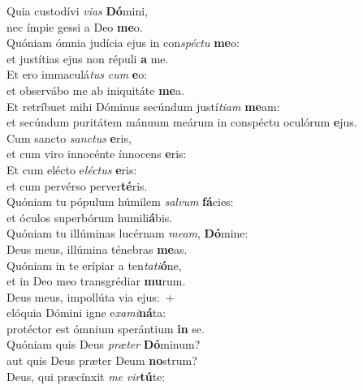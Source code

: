 \evenverse Quia custodívi \textit{vi}\textit{as} \textbf{Dó}mini,~\*\\
\evenverse nec ímpie gessi a Deo \textbf{me}o.\\
\oddverse Quóniam ómnia judícia ejus in con\textit{spé}\textit{ctu} \textbf{me}o:~\*\\
\oddverse et justítias ejus non répuli \textbf{a} me.\\
\evenverse Et ero immaculá\textit{tus} \textit{cum} \textbf{e}o:~\*\\
\evenverse et observábo me ab iniquitáte \textbf{me}a.\\
\oddverse Et retríbuet mihi Dóminus secúndum justí\textit{ti}\textit{am} \textbf{me}am:~\*\\
\oddverse et secúndum puritátem mánuum meárum in conspéctu oculórum \textbf{e}jus.\\
\evenverse Cum sancto \textit{san}\textit{ctus} \textbf{e}ris,~\*\\
\evenverse et cum viro innocénte ínnocens \textbf{e}ris:\\
\oddverse Et cum elécto e\textit{lé}\textit{ctus} \textbf{e}ris:~\*\\
\oddverse et cum pervérso perver\textbf{té}ris.\\
\evenverse Quóniam tu pópulum húmilem \textit{sal}\textit{vum} \textbf{fá}cies:~\*\\
\evenverse et óculos superbórum humili\textbf{á}bis.\\
\oddverse Quóniam tu illúminas lucérnam \textit{me}\textit{am}, \textbf{Dó}mine:~\*\\
\oddverse Deus meus, illúmina ténebras \textbf{me}as.\\
\evenverse Quóniam in te erípiar a ten\textit{ta}\textit{ti}\textbf{ó}ne,~\*\\
\evenverse et in Deo meo transgrédiar \textbf{mu}rum.\\
\oddverse Deus meus, impollúta via ejus:~+\\
\oddverse  elóquia Dómini igne e\textit{xa}\textit{mi}\textbf{ná}ta:~\*\\
\oddverse protéctor est ómnium sperántium \textbf{in} se.\\
\evenverse Quóniam quis Deus \textit{præ}\textit{ter} \textbf{Dó}minum?~\*\\
\evenverse aut quis Deus præter Deum \textbf{no}strum?\\
\oddverse Deus, qui præcínxit \textit{me} \textit{vir}\textbf{tú}te:~\*\\
